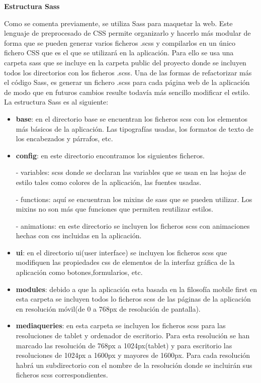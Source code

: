 \textbf{Estructura Sass}

Como se comenta previamente, se utiliza Sass para maquetar la web. Este lenguaje de preprocesado de CSS permite organizarlo y hacerlo más modular de
forma que se pueden generar varios ficheros .scss y compilarlos en un único fichero CSS que es el que se utilizará en la aplicación. Para ello se usa
una carpeta sass que se incluye en la carpeta public del proyecto donde se incluyen todos los directorios con los ficheros .scss. Una de las formas de
refactorizar más el código Sass, es generar un fichero .scss para cada página web de la aplicación de modo que en futuros cambios resulte todavía más
sencillo modificar el estilo. La estructura Sass es al siguiente:


\begin{itemize}

\item \textbf{base}: en el directorio base se encuentran los ficheros scss con los elementos más básicos de la aplicación. Las tipografías usadas, los formatos de texto de los encabezados y párrafos, etc.

\item \textbf{config}: en este directorio encontramos los siguientes ficheros.

- variables: scss donde se declaran las variables que se usan en las hojas de estilo tales como colores de la aplicación, las fuentes usadas.

- functions: aquí se encuentran los mixins de sass que se pueden utilizar. Los mixins no son más que funciones que permiten reutilizar estilos.

- animations: en este directorio se incluyen los ficheros scss con animaciones hechas con css incluidas en la aplicación.

\item \textbf{ui}: en el directorio ui(user interface) se incluyen los ficheros scss que modifiquen las propiedades css de elementos de la interfaz gráfica de la aplicación como botones,formularios, etc.

\item \textbf{modules}: debido a que la aplicación esta basada en la filosofía mobile first en esta carpeta se incluyen todos lo ficheros scss de las páginas de la aplicación en resolución móvil(de 0 a 768px de resolución de pantalla).

\item \textbf{mediaqueries}: en esta carpeta se incluyen los ficheros scss para las resoluciones de tablet y ordenador de escritorio. Para esta resolución se han marcado las resolución de 768px a 1024px(tablet) y para escritorio las resoluciones de 1024px a 1600px y mayores de 1600px. Para cada resolución habrá un subdirectorio con el nombre de la resolución donde se incluirán sus ficheros scss correspondientes.


\end{itemize}

